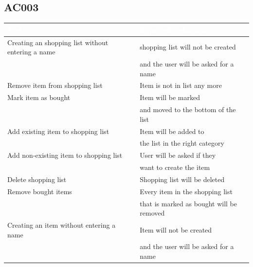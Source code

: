 \documentclass[12pt]{article}
\theoremstyle{definition}
\begin{document}
\subsection{AC003}

\begin{tabular}{|l|l|}
\hline
\cellcolor[gray]{0.5}\textcolor{white}{Test step} & \cellcolor[gray]{0.5}\textcolor{white}{Expected behaviour} \\ \hline
Creating an shopping list without entering a name & shopping list will not be created \\ 
 & and the user will be asked for a name \\ \hline
Remove item from shopping list & Item is not in list any more \\ \hline
Mark item as bought & Item will be marked \\
& and moved to the bottom of the list \\ \hline
Add existing item to shopping list & Item will be added to \\
& the list in the right category \\ \hline
Add non-existing item to shopping list & User will be asked if they \\
& want to create the item \\ \hline
Delete shopping list & Shopping list will be deleted \\ \hline
Remove bought items & Every item in the shopping list \\
& that is marked as bought will be removed \\ \hline
Creating an item without entering a name & Item will not be created \\ 
 & and the user will be asked for a name \\ \hline

\end{tabular}

\pagebreak
\end{document}
